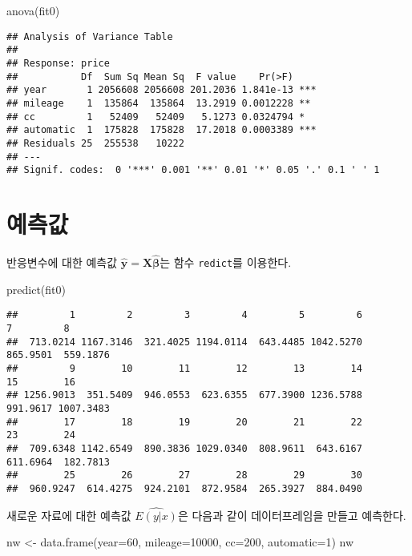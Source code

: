 \documentclass[
]{book}
\newenvironment{Shaded}{\begin{snugshade}}{\end{snugshade}}
\newcommand{\AttributeTok}[1]{\textcolor[rgb]{0.77,0.63,0.00}{#1}}
\newcommand{\DecValTok}[1]{\textcolor[rgb]{0.00,0.00,0.81}{#1}}
\newcommand{\FunctionTok}[1]{\textcolor[rgb]{0.00,0.00,0.00}{#1}}
\newcommand{\NormalTok}[1]{#1}
\newcommand{\OtherTok}[1]{\textcolor[rgb]{0.56,0.35,0.01}{#1}}
\begin{document}
\begin{Shaded}
\begin{Highlighting}[]
\FunctionTok{anova}\NormalTok{(fit0)}
\end{Highlighting}
\end{Shaded}

\begin{verbatim}
## Analysis of Variance Table
## 
## Response: price
##           Df  Sum Sq Mean Sq  F value    Pr(>F)    
## year       1 2056608 2056608 201.2036 1.841e-13 ***
## mileage    1  135864  135864  13.2919 0.0012228 ** 
## cc         1   52409   52409   5.1273 0.0324794 *  
## automatic  1  175828  175828  17.2018 0.0003389 ***
## Residuals 25  255538   10222                       
## ---
## Signif. codes:  0 '***' 0.001 '**' 0.01 '*' 0.05 '.' 0.1 ' ' 1
\end{verbatim}

\hypertarget{uxc608uxce21uxac12}{%
\section{예측값}\label{uxc608uxce21uxac12}}

반응변수에 대한 예측값 \(\hat {\bm y} = \bm X \hat {\bm \beta}\)는 함수 \texttt{redict}를 이용한다.

\begin{Shaded}
\begin{Highlighting}[]
\FunctionTok{predict}\NormalTok{(fit0)}
\end{Highlighting}
\end{Shaded}

\begin{verbatim}
##         1         2         3         4         5         6         7         8 
##  713.0214 1167.3146  321.4025 1194.0114  643.4485 1042.5270  865.9501  559.1876 
##         9        10        11        12        13        14        15        16 
## 1256.9013  351.5409  946.0553  623.6355  677.3900 1236.5788  991.9617 1007.3483 
##        17        18        19        20        21        22        23        24 
##  709.6348 1142.6549  890.3836 1029.0340  808.9611  643.6167  611.6964  182.7813 
##        25        26        27        28        29        30 
##  960.9247  614.4275  924.2101  872.9584  265.3927  884.0490
\end{verbatim}

새로운 자료에 대한 예측값 \(\widehat { E(y|x)}\)은 다음과 같이 데이터프레임을 만들고 예측한다.

\begin{Shaded}
\begin{Highlighting}[]
\NormalTok{nw }\OtherTok{\textless{}{-}} \FunctionTok{data.frame}\NormalTok{(}\AttributeTok{year=}\DecValTok{60}\NormalTok{, }\AttributeTok{mileage=}\DecValTok{10000}\NormalTok{, }\AttributeTok{cc=}\DecValTok{200}\NormalTok{, }\AttributeTok{automatic=}\DecValTok{1}\NormalTok{)}
\NormalTok{nw}
\end{Highlighting}
\end{Shaded}
\end{document}
